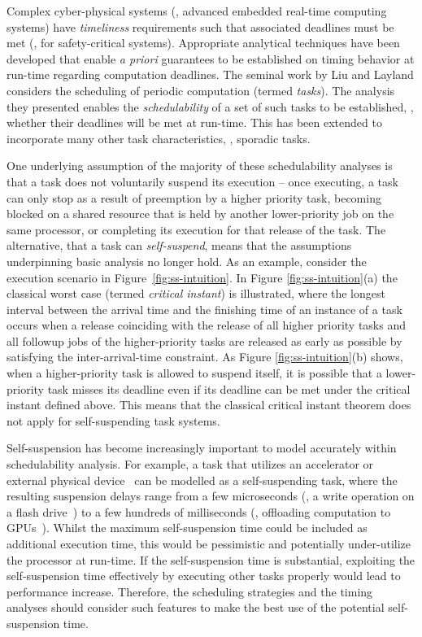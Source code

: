
Complex cyber-physical systems (\ie, advanced embedded real-time computing systems) have \emph{timeliness} requirements %
such that associated deadlines must be met (\eg, for safety-critical systems). Appropriate analytical techniques have been developed that enable \emph{a priori} guarantees to be established on timing behavior at run-time regarding computation deadlines.  
The seminal work by Liu and Layland \cite{Liu_1973} considers the scheduling of periodic computation (termed \emph{tasks}). 
The analysis they presented enables the \emph{schedulability} of a set of such tasks to be established, \ie, whether their deadlines will be met at run-time. This has been extended to incorporate many other task characteristics, \eg, sporadic tasks\cite{Mok:1983:FDP:888951}. 

One underlying assumption of the majority of these schedulability analyses is that a task does not voluntarily suspend its execution -- once executing, a task can only stop as a result of preemption by a higher priority task, becoming blocked on a shared resource that is held by another lower-priority job on the same processor, or completing its execution for that release of the task. The alternative, that a task can \emph{self-suspend}, means that the assumptions underpinning basic analysis no longer hold. As an example, consider the execution scenario in Figure~\ref{fig:ss-intuition}. In Figure \ref{fig:ss-intuition}(a) the classical worst case (termed \emph{critical instant}) is illustrated, where the longest interval between the arrival time and the finishing time of an instance of a task occurs when a release coinciding with the release of all higher priority tasks and all followup jobs of the higher-priority tasks are released as early as possible by satisfying the inter-arrival-time constraint. As Figure \ref{fig:ss-intuition}(b) shows, when a higher-priority task is allowed to suspend itself, it is possible that a lower-priority task misses its deadline even if its deadline can be met under the critical instant defined above. This means that the classical critical instant theorem does not apply for self-suspending task systems.


Self-suspension has become increasingly important to model accurately within schedulability analysis. For example, a task that utilizes an accelerator or external physical device~\cite{Kang:rtss07,Kato_2011} can be modelled as a self-suspending task, where the resulting suspension delays range from a few microseconds (\eg, a write operation on a flash drive~\cite{Kang:rtss07}) to a few hundreds of milliseconds (\eg, offloading computation to GPUs~\cite{Kato_2011,Liu_2014}).  Whilst the maximum self-suspension time could be included as additional execution time, this would be pessimistic and potentially under-utilize the processor at run-time. If the self-suspension time is substantial, exploiting the self-suspension time effectively by executing other tasks properly would lead to performance increase. Therefore, the scheduling strategies and the timing analyses should consider such features to make the best use of the potential self-suspension time.

